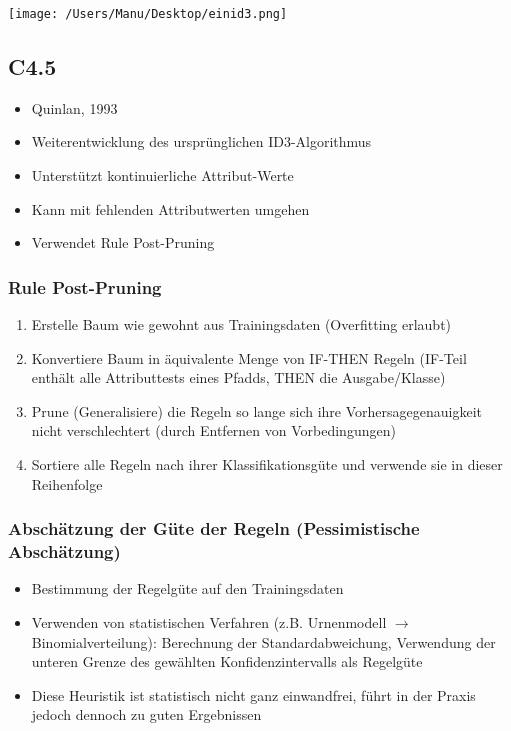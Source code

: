 \documentclass[paper=a4, fontsize=11pt]{scrartcl} %
\numberwithin{equation}{section} %
\numberwithin{figure}{section} %
\numberwithin{table}{section} %
\begin{document}
\texttt{[image: /Users/Manu/Desktop/einid3.png]}

\subsection{C4.5}

\begin{itemize}
\item Quinlan, 1993
\item Weiterentwicklung des ursprünglichen ID3-Algorithmus
\item Unterstützt kontinuierliche Attribut-Werte
\item Kann mit fehlenden Attributwerten umgehen
\item Verwendet Rule Post-Pruning
\end{itemize}

\subsubsection{Rule Post-Pruning}

\begin{enumerate}
\item Erstelle Baum wie gewohnt aus Trainingsdaten (Overfitting erlaubt)
\item Konvertiere Baum in äquivalente Menge von IF-THEN Regeln (IF-Teil enthält alle Attributtests eines Pfadds, THEN die Ausgabe/Klasse)
\item Prune (Generalisiere) die Regeln so lange sich ihre Vorhersagegenauigkeit nicht verschlechtert (durch Entfernen von Vorbedingungen)
\item Sortiere alle Regeln nach ihrer Klassifikationsgüte und verwende sie in dieser Reihenfolge
\end{enumerate}

\subsubsection{Abschätzung der Güte der Regeln (Pessimistische Abschätzung)}

\begin{itemize}
\item Bestimmung der Regelgüte auf den Trainingsdaten
\item Verwenden von statistischen Verfahren (z.B. Urnenmodell $\rightarrow$ Binomialverteilung): Berechnung der Standardabweichung, Verwendung der unteren Grenze des gewählten Konfidenzintervalls als Regelgüte
\item Diese Heuristik ist statistisch nicht ganz einwandfrei, führt in der Praxis jedoch dennoch zu guten Ergebnissen
\end{itemize}
\end{document}
